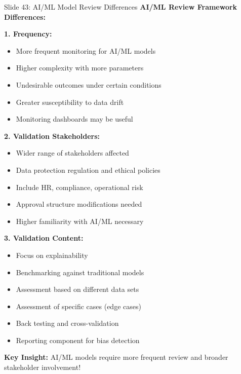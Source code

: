 \documentclass[8pt]{beamer}
\begin{document}
	\begin{frame}{Slide 43: AI/ML Model Review Differences}
		\fontsize{6.5}{7.5}\selectfont
		\textbf{AI/ML Review Framework Differences:}
		
		\vspace{0.1cm}
		\textbf{1. Frequency:}
		\begin{itemize}
			\item More frequent monitoring for AI/ML models
			\item Higher complexity with more parameters
			\item Undesirable outcomes under certain conditions
			\item Greater susceptibility to data drift
			\item Monitoring dashboards may be useful
		\end{itemize}
		
		\vspace{0.1cm}
		\textbf{2. Validation Stakeholders:}
		\begin{itemize}
			\item Wider range of stakeholders affected
			\item Data protection regulation and ethical policies
			\item Include HR, compliance, operational risk
			\item Approval structure modifications needed
			\item Higher familiarity with AI/ML necessary
		\end{itemize}
		
		\vspace{0.1cm}
		\textbf{3. Validation Content:}
		\begin{itemize}
			\item Focus on explainability
			\item Benchmarking against traditional models
			\item Assessment based on different data sets
			\item Assessment of specific cases (edge cases)
			\item Back testing and cross-validation
			\item Reporting component for bias detection
		\end{itemize}
		
		\textcolor{myblue}{\textbf{Key Insight:}} AI/ML models require \textcolor{myblue}{more frequent review and broader stakeholder involvement}!
	\end{frame}
	
\end{document}
